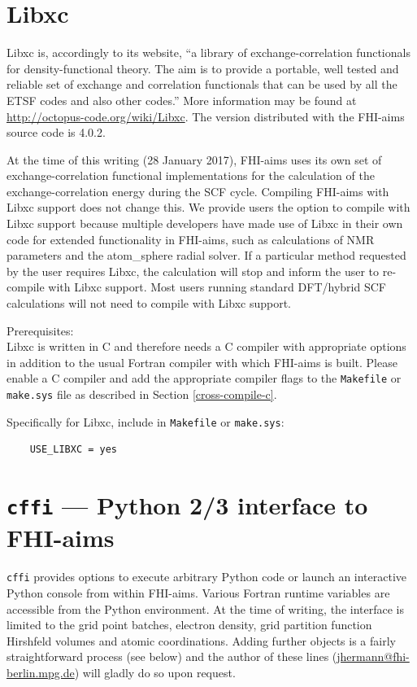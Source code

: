 \section{Libxc}
\label{app:spglib}
Libxc is, accordingly to its website, ``a library of exchange-correlation functionals 
for density-functional theory. The aim is to provide a portable, well tested and reliable 
set of exchange and correlation functionals that can be used by all the ETSF codes and 
also other codes.''  More information may be found at \url{http://octopus-code.org/wiki/Libxc}.
The version distributed with the FHI-aims source code is 4.0.2.

At the time of this writing (28 January 2017), FHI-aims uses its own set of 
exchange-correlation functional implementations for the calculation of the 
exchange-correlation energy during the SCF cycle.  Compiling FHI-aims with 
Libxc support does not change this.  We provide users the option to compile 
with Libxc support because multiple developers have made use of Libxc in
their own code for extended functionality in FHI-aims, such as calculations of
NMR parameters and the atom\_sphere radial solver.  If a particular method 
requested by the user requires Libxc, the calculation will stop and inform 
the user to re-compile with Libxc support.  Most users running standard 
DFT/hybrid SCF calculations will not need to compile with Libxc support.

Prerequisites: \\

Libxc is written in C and therefore needs a C compiler with
appropriate options in addition to the usual Fortran compiler with
which FHI-aims is built. Please enable a C compiler and add the
appropriate compiler flags to the \texttt{Makefile} or
\texttt{make.sys} file as described in Section \ref{cross-compile-c}. 

Specifically for Libxc, include in \texttt{Makefile} or \texttt{make.sys}:\\
  
\begin{verbatim}
    USE_LIBXC = yes
\end{verbatim}

\section{\texttt{cffi} --- Python 2/3 interface to FHI-aims}
\label{sec:cffi}

\verb+cffi+ provides options to execute arbitrary Python code or launch an
interactive Python console from within FHI-aims. Various Fortran runtime
variables are accessible from the Python environment. At the time of writing,
the interface is limited to the grid point batches, electron density, grid
partition function Hirshfeld volumes and atomic coordinations. Adding further
objects is a fairly straightforward process (see below) and the author of these
lines
(\href{mailto:jhermann@fhi-berlin.mpg.de?subject=\%5Baims\%20cffi\%5D}{jhermann@fhi-berlin.mpg.de})
will gladly do so upon request.

